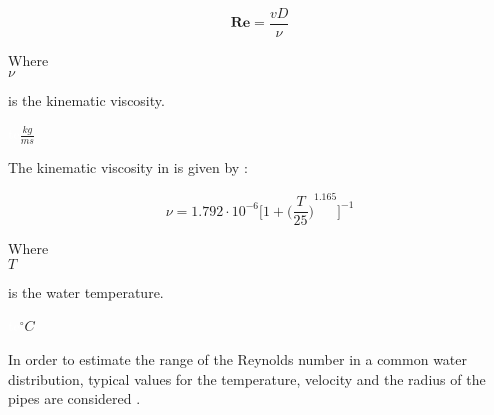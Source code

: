 \begin{equation}
   \pmb{Re} = \frac{vD}{\nu}
   \label{Reynolds}
 \end{equation}
 
  \begin{minipage}[t]{0.20\textwidth}
Where\\
\hspace*{8mm} $\nu$ 
\end{minipage}
\begin{minipage}[t]{0.68\textwidth}
\vspace*{2mm}
is the kinematic viscosity.

\end{minipage}
\begin{minipage}[t]{0.10\textwidth}
\vspace*{2mm}
\textcolor{White}{te}$\unit{\frac{kg}{ms}}$
\end{minipage}

The kinematic viscosity in \cite{Design_Water} is given by :

\begin{equation}
  \nu = 1.792 \cdot 10^{-6} \bigg[1+{\bigg(\frac{T}{25}\bigg)}^{1.165} \bigg]^{-1}
\end{equation}

  \begin{minipage}[t]{0.20\textwidth}
Where\\
\hspace*{8mm} $T$ 
\end{minipage}
\begin{minipage}[t]{0.68\textwidth}
\vspace*{2mm}
is the water temperature.
 \end{minipage}
\begin{minipage}[t]{0.10\textwidth}
\vspace*{2mm}
\textcolor{White}{te}$\unit{^{\circ} C}$
\end{minipage}

In order to estimate the range of the Reynolds number in a common water 
distribution, typical values for the temperature, velocity and the radius of 
the pipes are considered \cite{Urban_Design}. 


